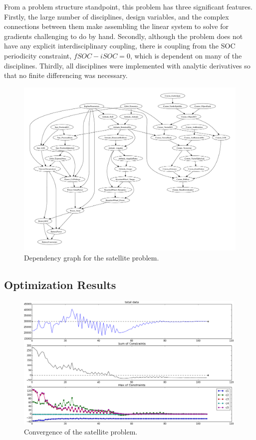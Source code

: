 \documentclass[]{aiaa-tc} %
\begin{document}
    From a problem structure standpoint, this problem has three significant features. Firstly, the large number of
    disciplines, design variables, and the complex connections between them make assembling the linear system to solve for gradients
    challenging to do by hand. Secondly, although the problem does not have any explicit interdisciplinary coupling,
    there is coupling from the SOC periodicity constraint, $fSOC - iSOC = 0$, which is dependent on many of the
    disciplines. Thirdly, all disciplines were implemented with analytic derivatives so that no finite differencing was
    necessary.

    \begin{figure}[!htb]\begin{center}
      \includegraphics[width=.95\textwidth]{images/CADRE.pdf}
      \caption{ Dependency graph for the satellite problem. \label{fig:cadre_graph}}
    \end{center}\end{figure}

    \subsection{Optimization Results}


        \begin{figure}[!htb]
        \centering
        \includegraphics[width=0.99\textwidth]{images/opt}
        \caption[width=0.22\textwidth]{Convergence of the satellite problem.
        \label{convergence}
        }
        \end{figure}
\end{document}
